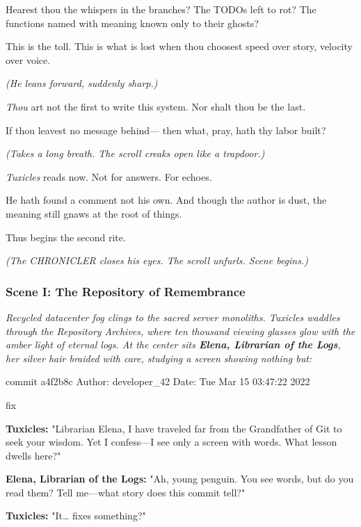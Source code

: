 Hearest thou the whispers in the branches? The TODOs left to rot? The functions named with meaning known only to their ghosts?

This is the toll. This is what is lost when thou choosest speed over story, velocity over voice.

\emph{(He leans forward, suddenly sharp.)}

\emph{Thou} art not the first to write this system. Nor shalt thou be the last.

If thou leavest no message behind--- then what, pray, hath thy labor built?

\emph{(Takes a long breath. The scroll creaks open like a trapdoor.)}

\emph{Tuxicles} reads now. Not for answers. For echoes.

He hath found a comment not his own. And though the author is dust, the meaning still gnaws at the root of things.

Thus begins the second rite.

\emph{(The CHRONICLER closes his eyes. The scroll unfurls. Scene begins.)}

\subsubsection{Scene I: The Repository of Remembrance}\label{scene-i-the-repository-of-remembrance}

\emph{Recycled datacenter fog clings to the sacred server monoliths. Tuxicles waddles through the Repository Archives, where ten thousand viewing glasses glow with the amber light of eternal logs. At the center sits \textbf{Elena, Librarian of the Logs}, her silver hair braided with care, studying a screen showing nothing but:}

\begin{codeblock}
commit a4f2b8c
Author: developer_42
Date: Tue Mar 15 03:47:22 2022

fix
\end{codeblock}

\textbf{Tuxicles:} "Librarian Elena, I have traveled far from the Grandfather of Git to seek your wisdom. Yet I confess---I see only a screen with words. What lesson dwells here?"

\textbf{Elena, Librarian of the Logs:} "Ah, young penguin. You see words, but do you read them? Tell me---what story does this commit tell?"

\textbf{Tuxicles:} "It\ldots{} fixes something?"

